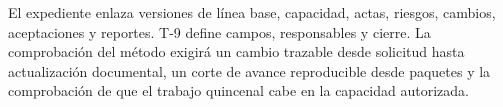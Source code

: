 El expediente enlaza versiones de línea base, capacidad, actas, riesgos, cambios, aceptaciones y reportes. T-9 define campos, responsables y cierre. La comprobación del método exigirá un cambio trazable desde solicitud hasta actualización documental, un corte de avance reproducible desde paquetes y la comprobación de que el trabajo quincenal cabe en la capacidad autorizada.
